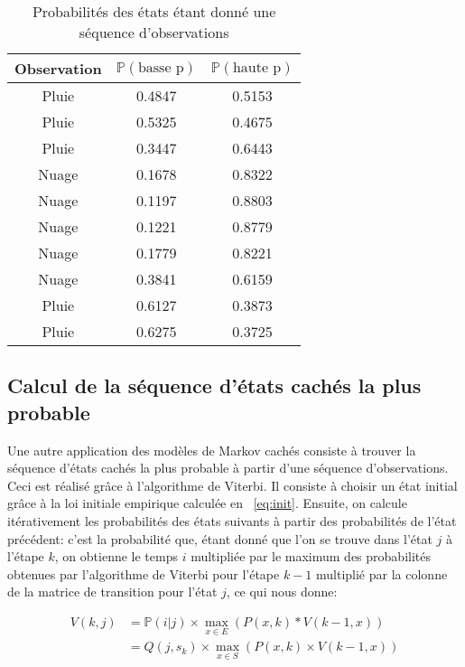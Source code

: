 \documentclass{article}
\begin{document}
\begin{multicols}{2}
\begin{table}[H]
    \begin{center}
        \centering
        \captionsetup{justification=centering}
        \caption{\label{tab:fwdbwd}Probabilités des états étant donné une séquence d'observations}
        \begin{tabular}{|c|c|c|}
            \hline
            Observation & $\mathbb{P}(\text{basse p})$ & $\mathbb{P}(\text{haute p})$ \\
            \hline
            Pluie & 0.4847 & 0.5153 \\
            Pluie & 0.5325 & 0.4675 \\
            Pluie & 0.3447 & 0.6443 \\
            Nuage & 0.1678 & 0.8322 \\
            Nuage & 0.1197 & 0.8803 \\
            Nuage & 0.1221 & 0.8779 \\
            Nuage & 0.1779 & 0.8221 \\
            Nuage & 0.3841 & 0.6159 \\
            Pluie & 0.6127 & 0.3873 \\
            Pluie & 0.6275 & 0.3725 \\
            \hline
        \end{tabular}
    \end{center}
\end{table}

\subsection{Calcul de la séquence d'états cachés la plus probable}

Une autre application des modèles de Markov cachés consiste à trouver la
séquence d'états cachés la plus probable à partir d'une séquence d'observations.
Ceci est réalisé grâce à l'algorithme de Viterbi. Il consiste à choisir un état
initial grâce à la loi initiale empirique calculée en ~\ref{eq:init}. Ensuite,
on calcule itérativement les probabilités des états suivants à partir des
probabilités de l'état précédent: c'est la probabilité que, étant donné que l'on
se trouve dans l'état $j$ à l'étape $k$, on obtienne le temps $i$ multipliée par
le maximum des probabilités obtenues par l'algorithme de Viterbi pour l'étape
$k - 1$ multiplié par la colonne de la matrice de transition pour l'état $j$,
ce qui nous donne:

\begin{equation}\label{eq:viterbi}
    \begin{split}
        V(k,j) &= \mathbb{P}(i | j) \times \operatorname*{max}_{x \in E}(P(x, k) * V(k - 1, x)) \\
               &= Q(j, s_k) \times \operatorname*{max}_{x \in S}(P(x, k) \times V(k - 1, x)) \\
    \end{split}
\end{equation}


\end{multicols}
\end{document}

